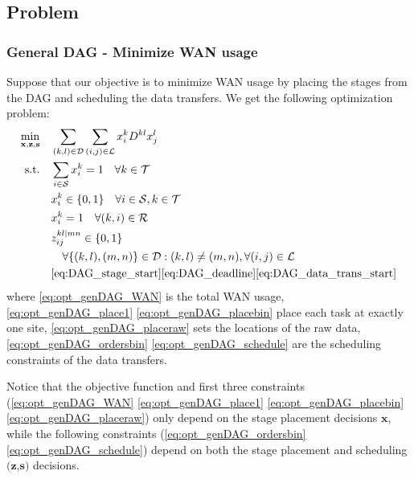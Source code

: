 \subsection{Problem}

\subsubsection{General DAG - Minimize WAN usage}

Suppose that our objective is to minimize WAN usage by placing the stages from the DAG and scheduling the data transfers.  We get the following optimization problem:
\begin{subequations} \label{eq:opt_genDAG}
	\begin{align}
		\min_{\mathbf{x},\mathbf{z},\mathbf{s}} \quad & \sum_{(k,l)\in\mathcal{D}}\sum_{(i,j)\in\mathcal{L}}x_i^kD^{kl}x_j^l \label{eq:opt_genDAG_WAN} \\
		\text{s.t.} \quad & \sum_{i\in\mathcal{S}}x_i^k = 1 \quad \forall k\in\mathcal{T} \label{eq:opt_genDAG_place1} \\
		& x_i^k \in\{0,1\} \quad \forall i\in\mathcal{S},k\in\mathcal{T} \label{eq:opt_genDAG_placebin} \\
		& x_i^k = 1 \quad \forall (k,i)\in\mathcal{R} \label{eq:opt_genDAG_placeraw} \\
		& z_{ij}^{kl|mn} \in\{0,1\} \nonumber\\
		& \quad \forall \{(k,l),(m,n)\} \in\mathcal{D}:(k,l)\neq(m,n), \forall(i,j)\in\mathcal{L} \label{eq:opt_genDAG_ordersbin} \\
		& \eqref{eq:DAG_stage_start} \eqref{eq:DAG_deadline} \eqref{eq:DAG_data_trans_start} \label{eq:opt_genDAG_schedule}
	\end{align}
\end{subequations}
where \eqref{eq:opt_genDAG_WAN} is the total WAN usage, \eqref{eq:opt_genDAG_place1} \eqref{eq:opt_genDAG_placebin} place each task at exactly one site, \eqref{eq:opt_genDAG_placeraw} sets the locations of the raw data, \eqref{eq:opt_genDAG_ordersbin} \eqref{eq:opt_genDAG_schedule} are the scheduling constraints of the data transfers.

Notice that the objective function and first three constraints (\eqref{eq:opt_genDAG_WAN} \eqref{eq:opt_genDAG_place1} \eqref{eq:opt_genDAG_placebin} \eqref{eq:opt_genDAG_placeraw}) only depend on the stage placement decisions $\mathbf{x}$, while the following constraints (\eqref{eq:opt_genDAG_ordersbin} \eqref{eq:opt_genDAG_schedule}) depend on both the stage placement and scheduling $(\mathbf{z}$,$\mathbf{s})$ decisions.

